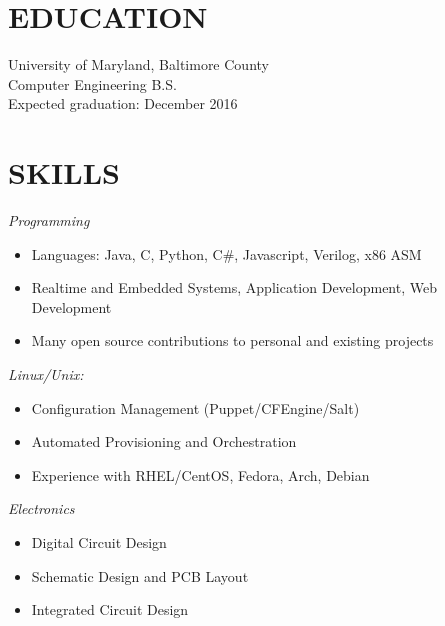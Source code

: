 \documentclass[line,0.5]{resume}
\begin{document}
\address{1222 Locust Ave Arbutus, MD 21227}
\address{(240) 547-9517, mark@hackafe.net}

\begin{resume}
\section{EDUCATION}
University of Maryland, Baltimore County \\
Computer Engineering B.S. \\
Expected graduation: December 2016
 
\section{SKILLS} {\sl Programming}
                \begin{itemize}
                \item Languages: Java, C, Python, C\#, Javascript, Verilog, x86 ASM
                \item Realtime and Embedded Systems, Application Development, Web Development
                \item Many open source contributions to personal and existing projects
                \end{itemize}
                {\sl Linux/Unix:}
                \begin{itemize}
                \item Configuration Management (Puppet/CFEngine/Salt)
                \item Automated Provisioning and Orchestration
                \item Experience with RHEL/CentOS, Fedora, Arch, Debian
                \end{itemize}
                {\sl Electronics}
                \begin{itemize}
                \item Digital Circuit Design
                \item Schematic Design and PCB Layout
                \item Integrated Circuit Design
                \end{itemize}
 

\end{resume}
\end{document}
